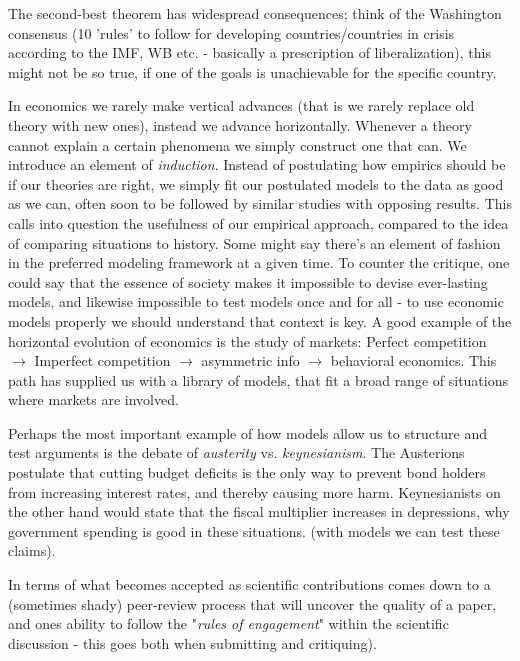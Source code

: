 \documentclass[12pt, a4paper]{article}
\begin{document}
\begin{multicols}{2}
The second-best theorem has widespread consequences; think of the Washington consensus (10 'rules' to follow for developing countries/countries in crisis according to the IMF, WB etc. - basically a prescription of liberalization), this might not be so true, if one of the goals is unachievable for the specific country. 

In economics we rarely make vertical advances (that is we rarely replace old theory with new ones), instead we advance horizontally. Whenever a theory cannot explain a certain phenomena we simply construct one that can. We introduce an element of \textit{induction}. Instead of postulating how empirics should be if our theories are right, we simply fit our postulated models to the data as good as we can, often soon to be followed by similar studies with opposing results. This calls into question the usefulness of our empirical approach, compared to the idea of comparing situations to history. Some might say there's an element of fashion in the preferred modeling framework at a given time. To counter the critique, one could say that the essence of society makes it impossible to devise ever-lasting models, and likewise impossible to test models once and for all - to use economic models properly we should understand that context is key. A good example of the horizontal evolution of economics is the study of markets: Perfect competition $\rightarrow$ Imperfect competition $\rightarrow$ asymmetric info $\rightarrow$ behavioral economics. This path has supplied us with a library of models, that fit a broad range of situations where markets are involved.   

Perhaps the most important example of how models allow us to structure and test arguments is the debate of \textit{austerity} vs. \textit{keynesianism}. The Austerions postulate that cutting budget deficits is the only way to prevent bond holders from increasing interest rates, and thereby causing more harm. Keynesianists on the other hand would state that the fiscal multiplier increases in depressions, why government spending is good in these situations. (with models we can test these claims).

In terms of what becomes accepted as scientific contributions comes down to a (sometimes shady) peer-review process that will uncover the quality of a paper, and ones ability to follow the "\textit{rules of engagement}" within the scientific discussion - this goes both when submitting and critiquing).


\end{multicols}
\end{document}
